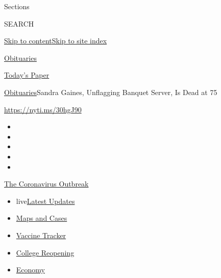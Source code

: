 Sections

SEARCH

\protect\hyperlink{site-content}{Skip to
content}\protect\hyperlink{site-index}{Skip to site index}

\href{https://www.nytimes.com/section/obituaries}{Obituaries}

\href{https://myaccount.nytimes.com/auth/login?response_type=cookie\&client_id=vi}{}

\href{https://www.nytimes.com/section/todayspaper}{Today's Paper}

\href{/section/obituaries}{Obituaries}\textbar{}Sandra Gaines,
Unflagging Banquet Server, Is Dead at 75

\url{https://nyti.ms/30hgJ90}

\begin{itemize}
\item
\item
\item
\item
\item
\end{itemize}

\href{https://www.nytimes.com/news-event/coronavirus?action=click\&pgtype=Article\&state=default\&region=TOP_BANNER\&context=storylines_menu}{The
Coronavirus Outbreak}

\begin{itemize}
\tightlist
\item
  live\href{https://www.nytimes.com/2020/08/03/world/coronavirus-covid-19.html?action=click\&pgtype=Article\&state=default\&region=TOP_BANNER\&context=storylines_menu}{Latest
  Updates}
\item
  \href{https://www.nytimes.com/interactive/2020/us/coronavirus-us-cases.html?action=click\&pgtype=Article\&state=default\&region=TOP_BANNER\&context=storylines_menu}{Maps
  and Cases}
\item
  \href{https://www.nytimes.com/interactive/2020/science/coronavirus-vaccine-tracker.html?action=click\&pgtype=Article\&state=default\&region=TOP_BANNER\&context=storylines_menu}{Vaccine
  Tracker}
\item
  \href{https://www.nytimes.com/2020/08/02/us/covid-college-reopening.html?action=click\&pgtype=Article\&state=default\&region=TOP_BANNER\&context=storylines_menu}{College
  Reopening}
\item
  \href{https://www.nytimes.com/live/2020/08/03/business/stock-market-today-coronavirus?action=click\&pgtype=Article\&state=default\&region=TOP_BANNER\&context=storylines_menu}{Economy}
\end{itemize}


